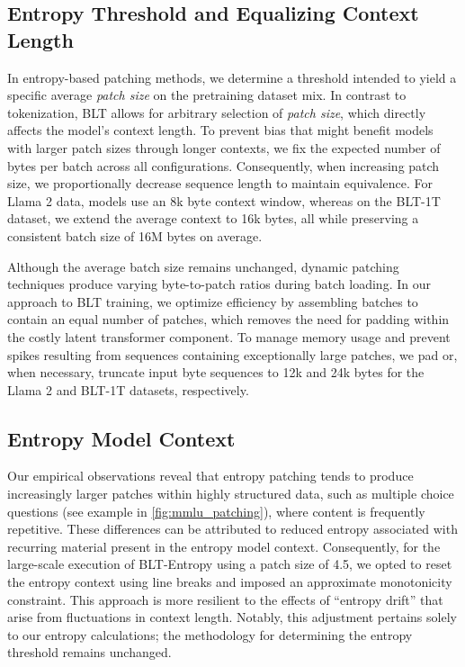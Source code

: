 \subsection{Entropy Threshold and Equalizing Context Length} In entropy-based patching methods, we determine a threshold intended to yield a specific average \textit{patch size} on the pretraining dataset mix. In contrast to tokenization, {\textsc BLT} allows for arbitrary selection of \textit{patch size}, which directly affects the model’s context length. To prevent bias that might benefit models with larger patch sizes through longer contexts, we fix the expected number of bytes per batch across all configurations. Consequently, when increasing patch size, we proportionally decrease sequence length to maintain equivalence. For Llama 2 data, models use an 8k byte context window, whereas on the {\textsc BLT}-1T dataset, we extend the average context to 16k bytes, all while preserving a consistent batch size of 16M bytes on average.

Although the average batch size remains unchanged, dynamic patching techniques produce varying byte-to-patch ratios during batch loading. In our approach to {\textsc BLT} training, we optimize efficiency by assembling batches to contain an equal number of patches, which removes the need for padding within the costly latent transformer component. To manage memory usage and prevent spikes resulting from sequences containing exceptionally large patches, we pad or, when necessary, truncate input byte sequences to 12k and 24k bytes for the Llama 2 and {\textsc BLT}-1T datasets, respectively.

\subsection{Entropy Model Context}
\label{section:entropy-context}
Our empirical observations reveal that entropy patching tends to produce increasingly larger patches within highly structured data, such as multiple choice questions (see example in \autoref{fig:mmlu_patching}), where content is frequently repetitive. These differences can be attributed to reduced entropy associated with recurring material present in the entropy model context. Consequently, for the large-scale execution of {\textsc BLT}-Entropy using a patch size of 4.5, we opted to reset the entropy context using line breaks and imposed an approximate monotonicity constraint. This approach is more resilient to the effects of “entropy drift” that arise from fluctuations in context length. Notably, this adjustment pertains solely to our entropy calculations; the methodology for determining the entropy threshold remains unchanged.

